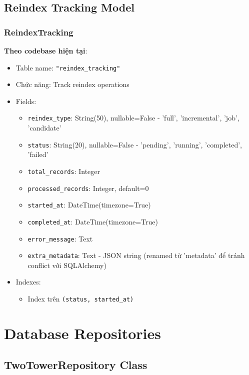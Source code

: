 \subsection{Reindex Tracking Model}

\subsubsection{ReindexTracking}

\textbf{Theo codebase hiện tại}:
\begin{itemize}
    \item Table name: \texttt{"reindex\_tracking"}
    \item Chức năng: Track reindex operations
    \item Fields:
    \begin{itemize}
        \item \texttt{reindex\_type}: String(50), nullable=False - 'full', 'incremental', 'job', 'candidate'
        \item \texttt{status}: String(20), nullable=False - 'pending', 'running', 'completed', 'failed'
        \item \texttt{total\_records}: Integer
        \item \texttt{processed\_records}: Integer, default=0
        \item \texttt{started\_at}: DateTime(timezone=True)
        \item \texttt{completed\_at}: DateTime(timezone=True)
        \item \texttt{error\_message}: Text
        \item \texttt{extra\_metadata}: Text - JSON string (renamed từ 'metadata' để tránh conflict với SQLAlchemy)
    \end{itemize}
    \item Indexes:
    \begin{itemize}
        \item Index trên \texttt{(status, started\_at)}
    \end{itemize}
\end{itemize}

\section{Database Repositories}

\subsection{TwoTowerRepository Class}

